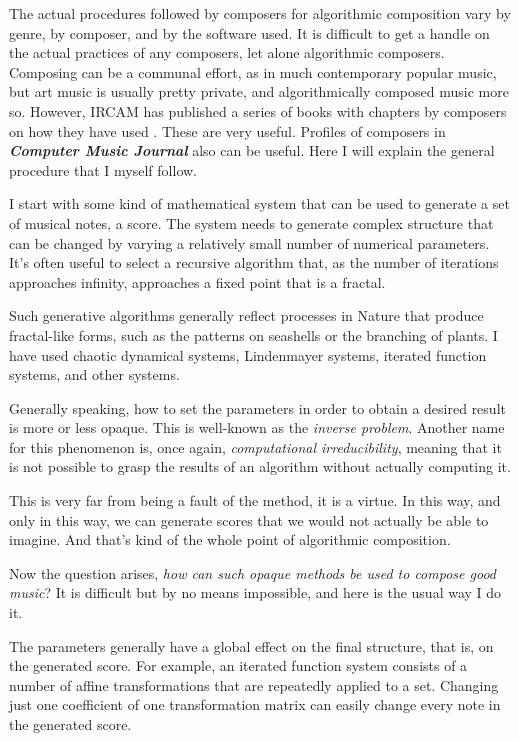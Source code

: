 \documentclass[11pt]{amsart}
\begin{document}
The actual procedures followed by composers for algorithmic composition vary by genre, by composer, and by the software used. It is difficult to get a handle on the actual practices of any composers, let alone algorithmic composers. Composing can be a communal effort, as in much contemporary popular music, but art music is usually pretty private, and algorithmically composed music more so. However, IRCAM has published a series of books with chapters by composers on how they have used  \cite{omcomposersbook, agon2006om, agon2008om, agon2016om}. These are very useful. Profiles of composers in \emph\textbf{Computer Music Journal} also can be useful. Here I will explain the general procedure that I myself follow.

I start with some kind of mathematical system that can be used to generate a set of musical notes, a score. The system needs to generate complex structure that can be changed by varying a relatively small number of numerical parameters. It’s often useful to select a recursive algorithm that, as the number of iterations approaches infinity, approaches a fixed point that is a fractal.

Such generative algorithms generally reflect processes in Nature that produce fractal-like forms, such as the patterns on seashells or the branching of plants. I have used chaotic dynamical systems, Lindenmayer systems, iterated function systems, and other systems.

Generally speaking, how to set the parameters in order to obtain a desired result is more or less opaque. This is well-known as the \emph{inverse problem}. Another name for this phenomenon is, once again, \emph{computational irreducibility}, meaning that it is not possible to grasp the results of an algorithm without actually computing it.

This is very far from being a fault of the method, it is a virtue. In this way, and only in this way, we can generate scores that we would not actually be able to imagine. And that’s kind of the whole point of algorithmic composition.

Now the question arises, \emph{how can such opaque methods be used to compose good music}? It is difficult but by no means impossible, and here is the usual way I do it.

The parameters generally have a global effect on the final structure, that is, on the generated score. For example, an iterated function system consists of a number of affine transformations that are repeatedly applied to a set. Changing just one coefficient of one transformation matrix can easily change every note in the generated score.
\end{document}
